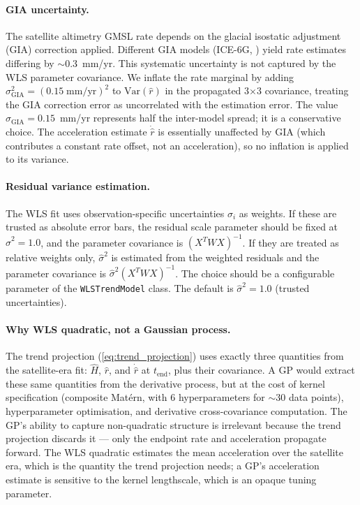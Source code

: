 \documentclass[11pt]{article}
\newcommand{\tend}{t_{\mathrm{end}}}
\begin{document}
\paragraph{GIA uncertainty.}  The satellite altimetry GMSL rate depends on the glacial isostatic adjustment (GIA) correction applied.  Different GIA models (ICE-6G, \citealt{Caron2018}) yield rate estimates differing by $\sim$0.3~mm/yr.  This systematic uncertainty is not captured by the WLS parameter covariance.  We inflate the rate marginal by adding $\sigma_{\mathrm{GIA}}^2 = (0.15\;\text{mm/yr})^2$ to $\mathrm{Var}(\hat{r})$ in the propagated 3$\times$3 covariance, treating the GIA correction error as uncorrelated with the estimation error.  The value $\sigma_{\mathrm{GIA}} = 0.15$~mm/yr represents half the inter-model spread; it is a conservative choice.  The acceleration estimate $\dot{\hat{r}}$ is essentially unaffected by GIA (which contributes a constant rate offset, not an acceleration), so no inflation is applied to its variance.

\paragraph{Residual variance estimation.}  The WLS fit uses observation-specific uncertainties $\sigma_i$ as weights.  If these are trusted as absolute error bars, the residual scale parameter should be fixed at $\hat\sigma^2 = 1.0$, and the parameter covariance is $(X^T W X)^{-1}$.  If they are treated as relative weights only, $\hat\sigma^2$ is estimated from the weighted residuals and the parameter covariance is $\hat\sigma^2 (X^T W X)^{-1}$.  The choice should be a configurable parameter of the \texttt{WLSTrendModel} class.  The default is $\hat\sigma^2 = 1.0$ (trusted uncertainties).

\paragraph{Why WLS quadratic, not a Gaussian process.}  The trend projection (\cref{eq:trend_projection}) uses exactly three quantities from the satellite-era fit: $\hat{H}$, $\hat{r}$, and $\dot{\hat{r}}$ at $\tend$, plus their covariance.  A GP would extract these same quantities from the derivative process, but at the cost of kernel specification (composite Mat\'ern, with 6 hyperparameters for $\sim$30 data points), hyperparameter optimisation, and derivative cross-covariance computation.  The GP's ability to capture non-quadratic structure is irrelevant because the trend projection discards it --- only the endpoint rate and acceleration propagate forward.  The WLS quadratic estimates the mean acceleration over the satellite era, which is the quantity the trend projection needs; a GP's acceleration estimate is sensitive to the kernel lengthscale, which is an opaque tuning parameter.
\end{document}

